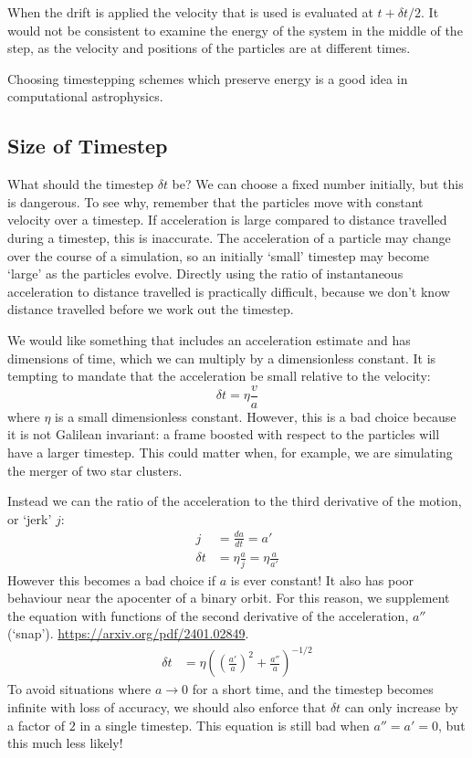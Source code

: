 \documentclass[12pt]{article}
\begin{document}
When the drift is applied the velocity that is used is evaluated at $t + \delta t /2$. It would not be consistent to examine the energy of the system in the middle of the step, as the velocity and positions of the particles are at different times.

Choosing timestepping schemes which preserve energy is a good idea in computational astrophysics.

\subsection{Size of Timestep}

What should the timestep $\delta t$ be? We can choose a fixed number initially, but this is dangerous. To see why, remember that the particles move with constant velocity over a timestep. If acceleration is large compared to distance travelled during a timestep, this is inaccurate. The acceleration of a particle may change over the course of a simulation, so an initially `small' timestep may become `large' as the particles evolve. Directly using the ratio of instantaneous acceleration to distance travelled is practically difficult, because we don't know distance travelled before we work out the timestep.

We would like something that includes an acceleration estimate and has dimensions of time, which we can multiply by a dimensionless constant. It is tempting to mandate that the acceleration be small relative to the velocity:
\begin{equation}
 \delta t = \eta \frac{v}{a}
\end{equation}
where $\eta$ is a small dimensionless constant. However, this is a bad choice because it is not Galilean invariant: a frame boosted with respect to the particles will have a larger timestep. This could matter when, for example, we are simulating the merger of two star clusters.

Instead we can the ratio of the acceleration to the third derivative of the motion, or `jerk' $j$:
\begin{align}
 j &= \frac{d a}{dt}  = a' \\
 \delta t  &= \eta \frac{a}{j} = \eta \frac{a}{a'}
\end{align}
However this becomes a bad choice if $a$ is ever constant! It also has poor behaviour near the apocenter of a binary orbit. For this reason, we supplement the equation with functions of the second derivative of the acceleration, $a''$ (`snap'). \url{https://arxiv.org/pdf/2401.02849}.
\begin{align}
\delta t &= \eta \left( \left(\frac{a'}{a}\right)^2 + \frac{a''}{a}\right)^{-1/2}
\end{align}
To avoid situations where $a \to 0$ for a short time, and the timestep becomes infinite with loss of accuracy, we should also enforce that $\delta t$ can only increase by a factor of $2$ in a single timestep. This equation is still bad when $a'' = a' = 0$, but this much less likely!
\end{document}

